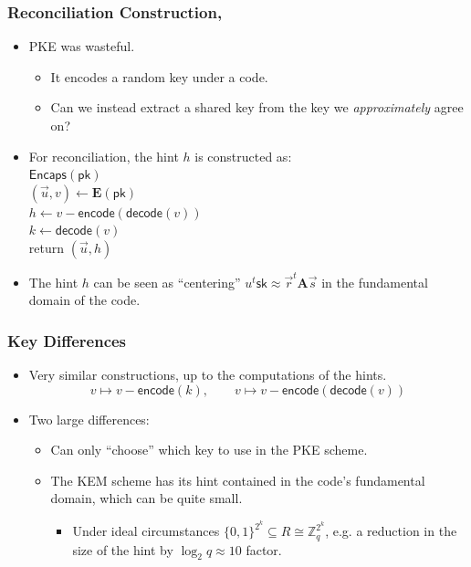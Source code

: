 \documentclass{beamer}
\newcommand{\pk}{\mathsf{pk}}
\newcommand{\sk}{\mathsf{sk}}
\newcommand{\encaps}{\mathsf{Encaps}}
\newcommand{\encode}{\mathsf{encode}}
\newcommand{\decode}{\mathsf{decode}}
\newcommand{\mat}[1]{\mathbf{#1}}
\theoremstyle{definition}
\begin{document}
\begin{frame}
	\frametitle{Reconciliation Construction, \cite{EPRINT:Ding12,PQCRYPTO:Peikert14,USENIX:ADPS16,EPRINT:JinZha17}}
	\begin{itemize}
		\item \alert{PKE} was \alert{wasteful}.\pause
		\begin{itemize}
			\item It encodes a \alert{random} key under a code.\pause
			\item Can we instead \alert{extract} a shared key from the key we \emph{approximately} agree on?\pause
		\end{itemize}
		\item For reconciliation, the \alert{hint} $h$ is constructed as:\pause \\
		$\encaps(\pk)$\\
		$(\vec u, v)\gets \textbf{E}(\pk)$\\
		$h \gets v - \encode(\decode(v))$\\
		$k \gets \decode(v)$\\
		return $(\vec u, h)$\pause
		\item The hint $h$ can be seen as ``centering'' $u^t\sk\approx \vec r^t\mat A\vec s$ in the fundamental domain of the code.
	\end{itemize}
\end{frame}


\begin{frame}
	\frametitle{Key Differences}
	\begin{itemize}
		\item Very similar constructions, up to the computations of the hints.
		\begin{equation*}
		v\mapsto v - \encode(k),\qquad v\mapsto v - \encode(\decode(v))
		\end{equation*}\pause
		\item Two large differences:
		\begin{itemize}
			\item Can only ``choose'' which key to use in the \alert{PKE} scheme.\pause
			\item The \alert{KEM} scheme has its hint contained in the code's fundamental domain, which can be quite small.\pause
			\begin{itemize}
				\item Under ideal circumstances $\{0,1\}^{2^k}\subseteq R \cong \mathbb{Z}_q^{2^k}$, e.g. a reduction in the size of the hint by $\log_2q\approx 10$ factor.
			\end{itemize}
		\end{itemize}
	\end{itemize}
\end{frame}
\end{document}
